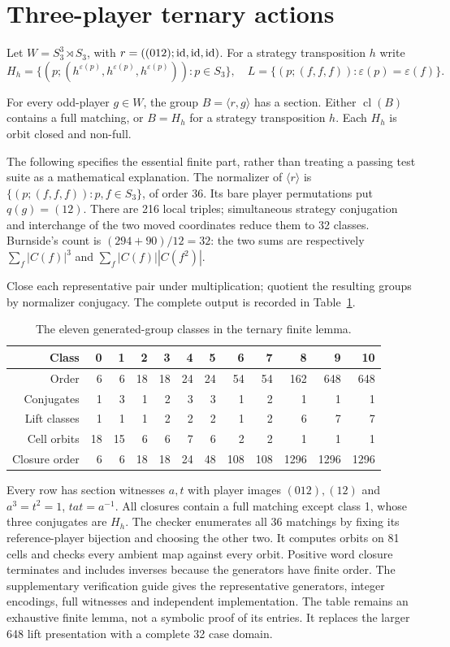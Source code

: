 \section{Three-player ternary actions}\label{sec:04-ternary}
Let $W=S_3^3\rtimes S_3$, with $r=((012);\mathrm{id},\mathrm{id},\mathrm{id})$. For a strategy
transposition $h$ write
\[
 H_h=\{(p;(h^{\varepsilon(p)},h^{\varepsilon(p)},h^{\varepsilon(p)})):p\in S_3\},
 \quad L=\{(p;(f,f,f)):\varepsilon(p)=\varepsilon(f)\}.
\]
\begin{lemma}\label{lem:finite}
For every odd-player $g\in W$, the group $B=\langle r,g\rangle$ has a section.
Either $\operatorname{cl}(B)$ contains a full matching, or $B=H_h$ for a
strategy transposition $h$. Each $H_h$ is orbit closed and non-full.
\end{lemma}
The following specifies the essential finite part, rather than treating a
passing test suite as a mathematical explanation. The normalizer of
$\langle r\rangle$ is
$\{(p;(f,f,f)):p,f\in S_3\}$, of order 36. Its bare player permutations put
$q(g)=(12)$. There are 216 local triples; simultaneous strategy conjugation and
interchange of the two moved coordinates reduce them to 32 classes. Burnside's
count is $(294+90)/12=32$: the two sums are respectively
$\sum_f|C(f)|^3$ and $\sum_f|C(f)||C(f^2)|$.

Close each representative pair under multiplication; quotient the resulting
groups by normalizer conjugacy. The complete output is recorded in Table~\ref{tab:ternary}.
\begin{table}[htbp]
\centering\small
\caption{The eleven generated-group classes in the ternary finite lemma.}\label{tab:ternary}
\begin{tabular}{rrrrrrrrrrrr}
\toprule
Class&0&1&2&3&4&5&6&7&8&9&10\\\midrule
Order&6&6&18&18&24&24&54&54&162&648&648\\
Conjugates&1&3&1&2&3&3&1&2&1&1&1\\
Lift classes&1&1&1&2&2&2&1&2&6&7&7\\
Cell orbits&18&15&6&6&7&6&2&2&1&1&1\\
Closure order&6&6&18&18&24&48&108&108&1296&1296&1296\\
\bottomrule
\end{tabular}
\end{table}
Every row has section witnesses $a,t$ with player images $(012),(12)$ and
$a^3=t^2=1$, $tat=a^{-1}$. All closures contain a full matching except class 1,
whose three conjugates are $H_h$. The checker enumerates all 36 matchings by
fixing its reference-player bijection and choosing the other two. It computes
orbits on 81 cells and checks every ambient map against every orbit. Positive
word closure terminates and includes inverses because the generators have
finite order. The supplementary verification guide gives the representative
generators, integer encodings, full witnesses and independent implementation.
The table remains an exhaustive finite lemma, not a symbolic proof of its
entries. It replaces the larger 648 lift presentation with a complete 32 case
domain.


